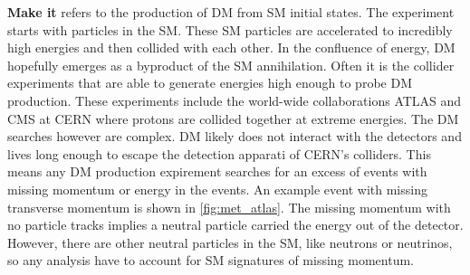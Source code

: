 \textbf{Make it} refers to the production of DM from SM initial states.
The experiment starts with particles in the SM.
These SM particles are accelerated to incredibly high energies and then collided with each other.
In the confluence of energy, DM hopefully emerges as a byproduct of the SM annihilation.
Often it is the collider experiments that are able to generate energies high enough to probe DM production.
These experiments include the world-wide collaborations ATLAS and CMS at CERN where protons are collided together at extreme energies.
The DM searches however are complex.
DM likely does not interact with the detectors and lives long enough to escape the detection apparati of CERN's colliders.
This means any DM production expirement searches for an excess of events with missing momentum or energy in the events.
An example event with missing transverse momentum is shown in \cref{fig:met_atlas}.
The missing momentum with no particle tracks implies a neutral particle carried the energy out of the detector.
However, there are other neutral particles in the SM, like neutrons or neutrinos, so any analysis have to account for SM signatures of missing momentum. \cite{atlas:met_dm_precise}

\begin{figure}[h]
\end{figure}

